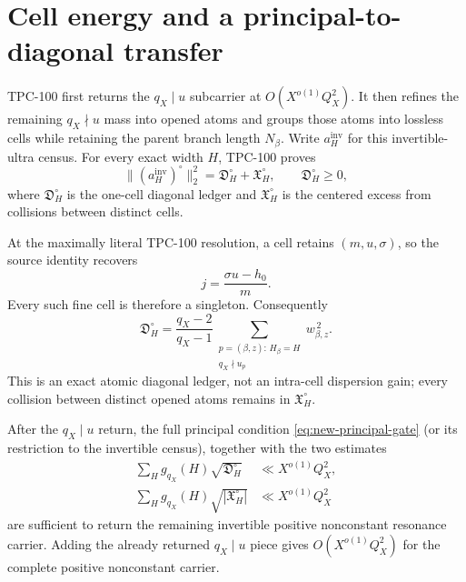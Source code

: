 \section{Cell energy and a principal-to-diagonal transfer}
\label{sec:diagonal-transfer}

TPC-100 first returns the \(q_X\mid u\) subcarrier at
\(O(X^{o(1)}Q_X^2)\).  It then refines the remaining
\(q_X\nmid u\) mass into opened atoms and groups those atoms into
lossless cells while retaining the parent branch length
\(N_\beta\).  Write \(a_H^{\mathrm{inv}}\) for this invertible-ultra
census.  For every exact width \(H\), TPC-100 proves
\begin{equation}
 \|(a_H^{\mathrm{inv}})^\circ\|_2^2
 =
 \mathfrak D_H^\circ+\mathfrak X_H^\circ,
\qquad
 \mathfrak D_H^\circ\ge0,
\label{eq:tpc100-energy}
\end{equation}
where \(\mathfrak D_H^\circ\) is the one-cell diagonal ledger and
\(\mathfrak X_H^\circ\) is the centered excess from collisions
between distinct cells.

At the maximally literal TPC-100 resolution, a cell retains
\((m,u,\sigma)\), so the source identity recovers
\[
 j=\frac{\sigma u-h_0}{m}.
\]
Every such fine cell is therefore a singleton.  Consequently
\[
 \mathfrak D_H^\circ
 =
 \frac{q_X-2}{q_X-1}
 \sum_{\substack{p=(\beta,z):\,H_\beta=H\\
                  q_X\nmid u_p}}
 w_{\beta,z}^{\,2}.
\]
This is an exact atomic diagonal ledger, not an intra-cell
dispersion gain; every collision between distinct opened atoms
remains in \(\mathfrak X_H^\circ\).

\begin{theorem}
\label{thm:width-cell-gates}
After the \(q_X\mid u\) return, the full principal condition
\eqref{eq:new-principal-gate} (or its restriction to the invertible
census), together with the two estimates
\begin{align}
 \sum_Hg_{q_X}(H)\sqrt{\mathfrak D_H^\circ}
 &\ll X^{o(1)}Q_X^2,
\label{eq:weighted-diagonal-gate}\\
 \sum_Hg_{q_X}(H)\sqrt{|\mathfrak X_H^\circ|}
 &\ll X^{o(1)}Q_X^2
\label{eq:weighted-cross-gate}
\end{align}
are sufficient to return the remaining invertible positive
nonconstant resonance carrier.  Adding the already returned
\(q_X\mid u\) piece gives
\(O(X^{o(1)}Q_X^2)\) for the complete positive nonconstant carrier.
\end{theorem}


